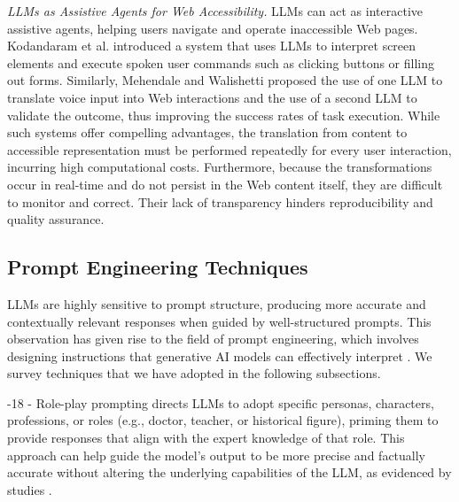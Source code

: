 \documentclass[sigconf, nonacm]{acmart}
\makeatletter
\renewcommand\subsubsection{\@startsection{subsubsection}{3}{\z@}%
  {-18\p@ \@plus -4\p@ \@minus -4\p@}%
  {-\p@}%
  {\normalfont\normalsize\itshape}%
}
\makeatother
\begin{document}
\emph{LLMs as Assistive Agents for Web Accessibility. } LLMs can act as interactive assistive agents, helping users navigate and operate inaccessible Web pages.
Kodandaram et al. \cite{kodandaram2024enabling} introduced a system that uses LLMs to interpret screen elements and execute spoken user commands such as clicking buttons or filling out forms. Similarly, Mehendale and Walishetti \cite{mehendale2024dexassist} proposed the use of one LLM to translate voice input into Web interactions and the use of a second LLM to validate the outcome, thus improving the success rates of task execution. While such systems offer compelling advantages, the translation from content to accessible representation must be performed repeatedly for every user interaction, incurring high computational costs. Furthermore, because the transformations occur in real-time and do not persist in the Web content itself, they are difficult to monitor and correct. Their lack of transparency hinders reproducibility and quality assurance.

\subsection{Prompt Engineering Techniques}

LLMs are highly sensitive to prompt structure, producing more accurate and contextually relevant responses when guided by well-structured prompts. This observation has given rise to the field of prompt engineering, which involves designing instructions that generative AI models can effectively interpret \cite{DBLP:journals/corr/abs-2302-11382, DBLP:journals/corr/abs-2402-07927}. We survey techniques that we have adopted in the following subsections.

\subsubsection{Role-play prompting} directs LLMs to adopt specific personas, characters, professions, or roles (e.g., doctor, teacher, or historical figure), priming them to provide responses that align with the expert knowledge of that role. This approach can help guide the model's output to be more precise and factually accurate without altering the underlying capabilities of the LLM, as evidenced by studies \cite{roleplay, DBLP:conf/acl/WangPQLZWGGN00024, DBLP:journals/nature/ShanahanMR23, fathallah2024neon, DBLP:journals/corr/abs-2406-18460}.
\end{document}
